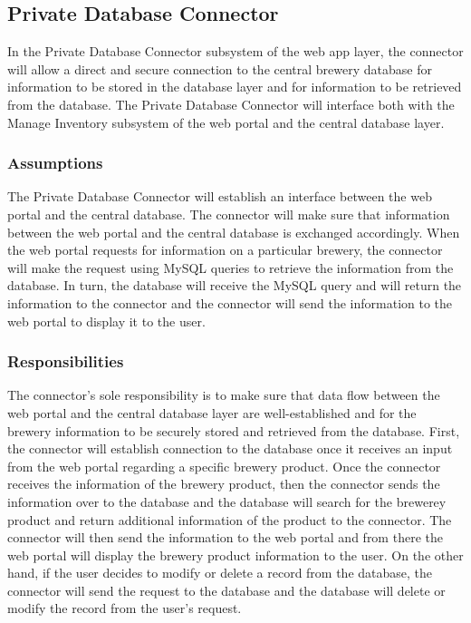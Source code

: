 \subsection{Private Database Connector}
In the Private Database Connector subsystem of the web app layer, the connector will allow a direct and secure connection to the central brewery database for information to be stored in the database layer and for information to be retrieved from the database.  The Private Database Connector will interface both with the Manage Inventory subsystem of the web portal and the central database layer.

\subsubsection{Assumptions}
The Private Database Connector will establish an interface between the web portal and the central database.  The connector will make sure that information between the web portal and the central database is exchanged accordingly.  When the web portal requests for information on a particular brewery, the connector will make the request using MySQL queries to retrieve the information from the database.  In turn, the database will receive the MySQL query and will return the information to the connector and the connector will send the information to the web portal to display it to the user.

\subsubsection{Responsibilities}
The connector's sole responsibility is to make sure that data flow between the web portal and the central database layer are well-established and for the brewery information to be securely stored and retrieved from the database.  First, the connector will establish connection to the database once it receives an input from the web portal regarding a specific brewery product.  Once the connector receives the information of the brewery product, then the connector sends the information over to the database and the database will search for the brewerey product and return additional information of the product to the connector.  The connector will then send the information to the web portal and from there the web portal will display the brewery product information to the user.
On the other hand, if the user decides to modify or delete a record from the database, the connector will send the request to the database and the database will delete or modify the record from the user's request.

